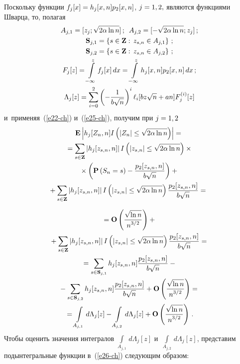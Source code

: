 \begin{multicols}{2}
 Поскольку функции $f_j[x]\hm=h_j[x,n] p_2[x,n]$, $j\hm=1,2,$ 
 являются функциями Шварца, то,  полагая
 \begin{gather}
A_{j,1}=[z_{j};\sqrt {2\alpha \ln n}]\,;\enskip
 A_{j,2}=[-\sqrt {2\alpha \ln n};z_{j}]\,;
 \notag\\
{\bf S}_{j,1}=\left\{s\in {\bf Z}:\, z_{s,n}\in A_{j,1}\right\}\,;\notag\\
 {\bf S}_{j,2}=\left\{s\in {\bf Z}:\, z_{s,n}\in A_{j,2}\right\}\,;
\notag\\
F_j[z]=\int\limits_{-\infty}^z f_j[x] \,dx
 =\int\limits_{-\infty}^z h_j[x,n] p_2[x,n]\, dx\,;
\label{e26-ch}\\
\Lambda_j[z]=\sum\limits_{i=0}^2 \left(-\displaystyle\frac{\displaystyle 1\mathstrut}{\displaystyle b\sqrt{n}\mathstrut}\right)^i
 \ell_i[bz\sqrt{n}+an]F_j^{(i)}[z]
 \label{e27-ch}
 \end{gather}
 и~применяя~(\ref{e22-ch}) и~(\ref{e25-ch}), получим при $j\hm=1,2$
 \begin{multline*}
 \mathbf{E}\left|h_j[Z_n,n]I\left( |Z_n|\le \sqrt {2\alpha \ln n}\right)\right|={}
 \\
 {} =\sum\limits_{s\in \mathbf{Z}}
 \left|h_j[z_{s,n},n]\right| I\left( |z_{s,n}|\le \sqrt {2\alpha \ln n}\right)
\times{}\\
{}\times \left(\mathbf{P}\left(S_n=s\right)-\displaystyle\frac{\displaystyle p_2[z_{s,n},n]\mathstrut}{\displaystyle b\sqrt{n}\mathstrut}\right)+{}\\
\hspace*{-2.92pt}{}+ \sum\limits_{s\in \mathbf{Z}}
 \left|h_j[z_{s,n},n]\right| I\left( |z_{s,n}|\le \sqrt {2\alpha \ln n}\right)
 \displaystyle\frac{\displaystyle p_2[z_{s,n},n]\mathstrut}{\displaystyle b\sqrt{n}\mathstrut}={}
\end{multline*}

\noindent
\begin{multline}
 {}=\mathbf{O}\left(\displaystyle\frac{\displaystyle \sqrt{\ln n}\mathstrut}{\displaystyle n^{3/2}\mathstrut}\right)
 + {}\\
 {}+\sum\limits_{s\in \mathbf{Z}}
 \left|h_j[z_{s,n},n]\right| I\left( |z_{s,n}|\le \sqrt {2\alpha \ln n}\right)
 \displaystyle\frac{\displaystyle p_2[z_{s,n},n]\mathstrut}{\displaystyle b\sqrt{n}\mathstrut}={}
\\
{}= \sum\limits_{s\in {\bf S}_{j,1}} h_j[z_{s,n},n] \displaystyle\frac{\displaystyle p_2[z_{s,n},n]\mathstrut}{\displaystyle b\sqrt{n}\mathstrut}
 - {}\\
 {}-\sum\limits_{s\in {\bf S}_{j,2}} h_j[z_{s,n},n] \displaystyle\frac{\displaystyle p_2[z_{s,n},n]\mathstrut}{\displaystyle b\sqrt{n}\mathstrut}
 +\mathbf{O}\left(\displaystyle\frac{\displaystyle \sqrt{\ln n}\mathstrut}{\displaystyle n^{3/2}\mathstrut}\right)={}
\\
{}=\int\limits_{A_{j,1}} d\Lambda_j[z]- \int\limits_{A_{j,2}} d\Lambda_j[z]
 +\mathbf{O}\left(\displaystyle\frac{\displaystyle \sqrt{\ln n}\mathstrut}{\displaystyle n^{3/2}\mathstrut}\right)\,.
\label{e28-ch}
 \end{multline}
 Чтобы оценить значения интегралов
 $\int\limits_{A_{j,1}} \,d\Lambda_j[z]$ 
 и~$\int\limits_{A_{j,2}} \,d\Lambda_j[z]$,
 представим подынтегральные функции в~(\ref{e26-ch}) следующим образом:
 

\end{multicols}

